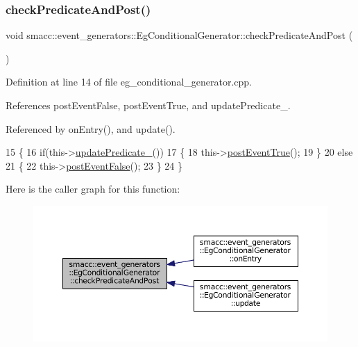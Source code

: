 \subsubsection{\texorpdfstring{check\+Predicate\+And\+Post()}{checkPredicateAndPost()}}
{\footnotesize\ttfamily void smacc\+::event\+\_\+generators\+::\+Eg\+Conditional\+Generator\+::check\+Predicate\+And\+Post (\begin{DoxyParamCaption}{ }\end{DoxyParamCaption})\hspace{0.3cm}{\ttfamily [private]}}



Definition at line 14 of file eg\+\_\+conditional\+\_\+generator.\+cpp.



References post\+Event\+False, post\+Event\+True, and update\+Predicate\+\_\+.



Referenced by on\+Entry(), and update().


\begin{DoxyCode}
15         \{
16             \textcolor{keywordflow}{if}(this->\hyperlink{classsmacc_1_1event__generators_1_1EgConditionalGenerator_a4e4092ecfa7278deda39e8ade6455362}{updatePredicate\_}())
17             \{
18                 this->\hyperlink{classsmacc_1_1event__generators_1_1EgConditionalGenerator_a888c44b5585274947b57143611a8670d}{postEventTrue}();
19             \}
20             \textcolor{keywordflow}{else}
21             \{
22                 this->\hyperlink{classsmacc_1_1event__generators_1_1EgConditionalGenerator_ac45d7b197cc4cf361602c72dc85ed62a}{postEventFalse}();
23             \}
24         \}
\end{DoxyCode}
Here is the caller graph for this function\+:
\nopagebreak
\begin{figure}[H]
\begin{center}
\leavevmode
\includegraphics[width=350pt]{classsmacc_1_1event__generators_1_1EgConditionalGenerator_a2a7e8a3818ffd1899682be9bbb8ae339_icgraph}
\end{center}
\end{figure}
\mbox{\label{classsmacc_1_1event__generators_1_1EgConditionalGenerator_ae3413453dceeabdf20cba6f1f19fc40c}} 
